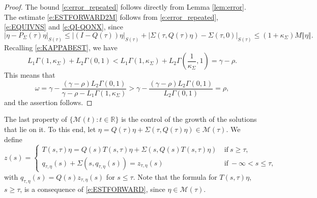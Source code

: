 \documentclass[a4paper,11pt,reqno]{amsart}
\theoremstyle{plain}
\theoremstyle{definition}
\numberwithin{equation}{section}
\newcommand{\R}{\mathbb{R}}
\newcommand{\calm}{\mathcal M}
\newcommand{\norm}[1]{\left\Vert#1\right\Vert}
\renewcommand{\geq}{\geqslant}
\renewcommand{\leq}{\leqslant}
\begin{document}
\begin{proof}
The bound \eqref{e:error_repeated} follows directly from Lemma \ref{lem:error}. The estimate \eqref{e:ESTFORWARD2M} follows from \eqref{e:error_repeated}, \eqref{e:EQUIVNS} and \eqref{e:QI-QONX}, since
$$|\eta-P_\Sigma(\tau)\eta|_{S(\tau)}\leq|(I-Q(\tau))\eta|_{S(\tau)}+|\Sigma(\tau,Q(\tau)\eta)-\Sigma(\tau,0)|_{S(\tau)}\leq(1+\kappa_\Sigma)M\norm{\eta}.$$
Recalling \eqref{e:KAPPABEST}, we have
$$L_1\Gamma(1,\kappa_\Sigma)+L_2\Gamma(0,1)<L_1\Gamma(1,\kappa_\Sigma)+L_2\Gamma\left(\frac{1}{\kappa_\Sigma},1\right) =\gamma-\rho.$$
This means that
$$
\omega = \gamma  - \frac{(\gamma-\rho)L_2\Gamma(0,1)}{\gamma-\rho-L_1\Gamma(1,\kappa_\Sigma)} > \gamma - \frac{(\gamma-\rho)L_2\Gamma(0,1)}{L_2\Gamma(0,1)} = \rho,
$$
and the assertion follows.
\end{proof}

The last property of $\{\calm(t)\colon t\in\R\}$ is the control of the growth of the solutions that lie on it. To this end, let $\eta=Q(\tau)\eta+\Sigma(\tau,Q(\tau)\eta)\in\calm(\tau)$. We define 
\begin{equation}\label{e:XI}
z(s)=\begin{cases}
T(s,\tau)\eta=Q(s)T(s,\tau)\eta+\Sigma(s,Q(s)T(s,\tau)\eta)&\ \text{if}\  s\geq\tau,\\
q_{\tau,\eta}(s)+\Sigma(s,q_{\tau,\eta}(s))=z_{\tau,\eta}(s)&\ \text{if}\  -\infty<s\leq\tau,
\end{cases}
\end{equation}
with $q_{\tau,\eta}(s)=Q(s)z_{\tau,\eta}(s)$ for $s\leq\tau$. Note that the formula for $T(s,\tau)\eta$, $s\geq\tau$, is a consequence of 
\eqref{e:ESTFORWARD}, since $\eta\in\calm(\tau)$.
\end{document}
